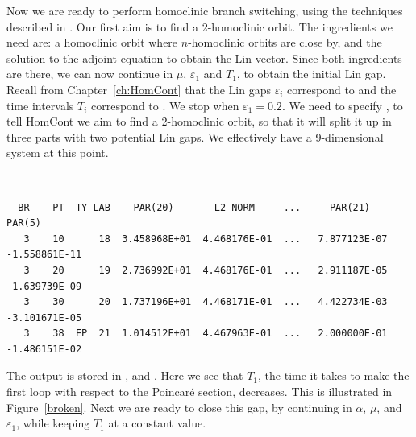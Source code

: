 Now we are ready to perform homoclinic branch switching, using
the techniques described in \cite{OlChKr:02}. 
Our first aim is to find a 2-homoclinic orbit. The
ingredients we need are: a homoclinic orbit where $n$-homoclinic orbits
are close by, and the solution to the adjoint equation to
obtain the Lin vector. Since both ingredients are there, we can now
continue in $\mu$, $\varepsilon_1$ and $T_1$, to obtain the initial
Lin gap. Recall from Chapter~\ref{ch:HomCont} that the Lin gaps 
$\varepsilon_i$ correspond to
 and the time intervals $T_i$ 
correspond to . We stop when
$\varepsilon_1=0.2$. We need to specify , to tell 
{\cal HomCont} we
aim to find a 2-homoclinic orbit, so that it will split it up in three
parts with two potential Lin gaps. We effectively have a 9-dimensional
system at this point.
\begin{center}
 \\
\end{center} 
\begin{verbatim}
  BR    PT  TY LAB    PAR(20)       L2-NORM     ...     PAR(21)       PAR(5)
   3    10      18  3.458968E+01  4.468176E-01  ...   7.877123E-07 -1.558861E-11
   3    20      19  2.736992E+01  4.468176E-01  ...   2.911187E-05 -1.639739E-09
   3    30      20  1.737196E+01  4.468171E-01  ...   4.422734E-03 -3.101671E-05
   3    38  EP  21  1.014512E+01  4.467963E-01  ...   2.000000E-01 -1.486151E-02
\end{verbatim}
The output is stored in ,   and .
Here we see that $T_1$, the time it takes to make the first loop with
respect to the Poincar\'e section, decreases. This is illustrated in
Figure~\ref{broken}. Next we are ready to close this gap, by continuing
in $\alpha$, $\mu$, and $\varepsilon_1$, while keeping $T_1$ at a
constant value.

